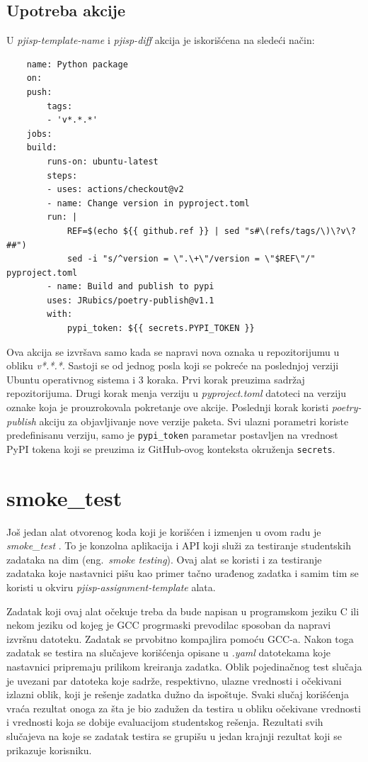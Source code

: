\documentclass[12pt]{report}
\begin{document}
\subsection{Upotreba akcije}
U \textit{pjisp-template-name} i \textit{pjisp-diff} akcija je iskorišćena na sledeći način:
\begin{samepage}
    \begin{verbatim}
    name: Python package
    on:
    push:
        tags:
        - 'v*.*.*'
    jobs:
    build:
        runs-on: ubuntu-latest
        steps:
        - uses: actions/checkout@v2
        - name: Change version in pyproject.toml
        run: |
            REF=$(echo ${{ github.ref }} | sed "s#\(refs/tags/\)\?v\?##")
            sed -i "s/^version = \".\+\"/version = \"$REF\"/" pyproject.toml
        - name: Build and publish to pypi
        uses: JRubics/poetry-publish@v1.1
        with:
            pypi_token: ${{ secrets.PYPI_TOKEN }}
    \end{verbatim}
\end{samepage}

Ova akcija se izvršava samo kada se napravi nova oznaka u repozitorijumu u obliku \textit{v*.*.*}. Sastoji se od jednog posla koji se pokreće na poslednjoj verziji Ubuntu operativnog sistema i 3 koraka. Prvi korak preuzima sadržaj repozitorijuma. Drugi korak menja verziju u \textit{pyproject.toml} datoteci na verziju oznake koja je prouzrokovala pokretanje ove akcije. Poslednji korak koristi \textit{poetry-publish} akciju za objavljivanje nove verzije paketa. Svi ulazni porametri koriste predefinisanu verziju, samo je \texttt{pypi\_token} parametar postavljen na vrednost PyPI tokena koji se preuzima iz GitHub-ovog konteksta okruženja \texttt{secrets}.

\section{smoke\_test}
Još jedan alat otvorenog koda koji je korišćen i izmenjen u ovom radu je \textit{smoke\_test} \cite{smoke-test}. To je konzolna aplikacija i API koji služi za testiranje studentskih zadataka na dim (eng.\ \textit{smoke testing}). Ovaj alat se koristi i za testiranje zadataka koje nastavnici pišu kao primer tačno urađenog zadatka i samim tim se koristi u okviru \textit{pjisp-assignment-template} alata.

Zadatak koji ovaj alat očekuje treba da bude napisan u programskom jeziku C ili nekom jeziku od kojeg je GCC progrmaski prevodilac sposoban da napravi izvršnu datoteku. Zadatak se prvobitno kompajlira pomoću GCC-a. Nakon toga zadatak se testira na slučajeve korišćenja opisane u \textit{.yaml} datotekama koje nastavnici pripremaju prilikom kreiranja zadatka. Oblik pojedinačnog test slučaja je uvezani par datoteka koje sadrže, respektivno, ulazne vrednosti i očekivani izlazni oblik, koji je rešenje zadatka dužno da ispoštuje. Svaki slučaj korišćenja vraća rezultat onoga za šta je bio zadužen da testira u obliku očekivane vrednosti i vrednosti koja se dobije evaluacijom studentskog rešenja. Rezultati svih slučajeva na koje se zadatak testira se grupišu u jedan krajnji rezultat koji se prikazuje korisniku.
\end{document}
